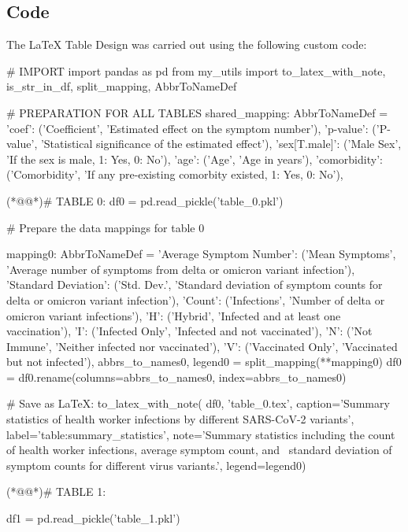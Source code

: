 \documentclass[11pt]{article}
\begin{document}
\subsection{{Code}}
The LaTeX Table Design was carried out using the following custom code:

\begin{python}

# IMPORT 
import pandas as pd 
from my_utils import to_latex_with_note, is_str_in_df, split_mapping, AbbrToNameDef 

# PREPARATION FOR ALL TABLES 
shared_mapping: AbbrToNameDef = { 
    'coef': ('Coefficient', 'Estimated effect on the symptom number'), 
    'p-value': ('P-value', 'Statistical significance of the estimated effect'),
    'sex[T.male]': ('Male Sex', 'If the sex is male, 1: Yes, 0: No'),
    'age': ('Age', 'Age in years'), 
    'comorbidity': ('Comorbidity', 'If any pre-existing comorbity existed, 1: Yes, 0: No'),  
} 

(*@@*)# TABLE 0: 
df0 = pd.read_pickle('table_0.pkl') 

# Prepare the data mappings for table 0 

mapping0: AbbrToNameDef = { 
    'Average Symptom Number': ('Mean Symptoms', 'Average number of symptoms from delta or omicron variant infection'), 
    'Standard Deviation': ('Std. Dev.', 'Standard deviation of symptom counts for delta or omicron variant infection'), 
    'Count': ('Infections', 'Number of delta or omicron variant infections'),
    'H': ('Hybrid', 'Infected and at least one vaccination'),
    'I': ('Infected Only', 'Infected and not vaccinated'),
    'N': ('Not Immune', 'Neither infected nor vaccinated'), 
    'V': ('Vaccinated Only', 'Vaccinated but not infected'), 
} 
abbrs_to_names0, legend0 = split_mapping({**mapping0}) 
df0 = df0.rename(columns=abbrs_to_names0, index=abbrs_to_names0) 

# Save as LaTeX: 
to_latex_with_note( 
    df0, 'table_0.tex', 
    caption='Summary statistics of health worker infections by different SARS-CoV-2 variants', 
    label='table:summary_statistics', 
    note='Summary statistics including the count of health worker infections, average symptom count, and \
    standard deviation of symptom counts for different virus variants.', 
    legend=legend0) 

(*@@*)# TABLE 1: 

df1 = pd.read_pickle('table_1.pkl') 


\end{python}
\end{document}
